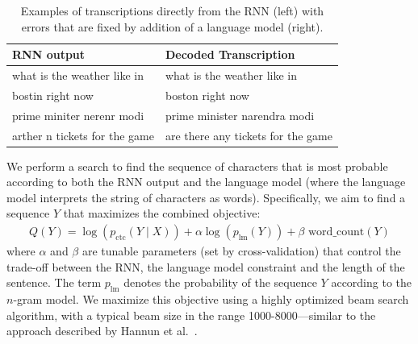 \begin{table}[h]
\centering
\begin{tabular}{l | l}
\toprule
RNN output  & Decoded Transcription \\
\midrule
\rule{0pt}{2ex}
what is the weather like in & what is the weather like in \\
\rule{0pt}{0.1ex}
bostin right now       & boston right now \\
\rule{0pt}{4ex}
prime miniter nerenr modi   & prime minister narendra modi \\ 
\rule{0pt}{4ex}
arther n tickets for the game  & are there any tickets for the game \\ 
\bottomrule
\end{tabular}
\caption{Examples of transcriptions directly from the RNN (left) with errors
         that are fixed by addition of a language model (right).}
\label{table:deepspeech:max_decoded}
\end{table}

We perform a search to find the sequence of characters that is most probable
according to both the RNN output and the language model (where the language
model interprets the string of characters as words). Specifically, we aim to
find a sequence $Y$ that maximizes the combined objective:
\begin{align*}
    Q(Y) = \log(p_{\text{ctc}}(Y \mid X)) + \alpha \log(p_{\text{lm}}(Y)) + \beta \textrm{ word\_count}(Y)
\end{align*}
where $\alpha$ and $\beta$ are tunable parameters (set by cross-validation)
that control the trade-off between the RNN, the language model constraint and
the length of the sentence. The term $p_{\text{lm}}$ denotes the
probability of the sequence $Y$ according to the $n$-gram model. We maximize
this objective using a highly optimized beam search algorithm, with a typical
beam size in the range 1000-8000---similar to the approach described by Hannun
et al.~\cite{hannun2014firstpass}.
